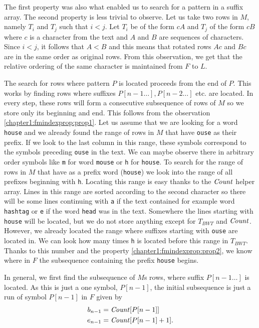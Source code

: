 The first property was also what enabled us to search for a pattern in a suffix array. The second
property is less trivial to observe. Let us take two rows in $M$, namely $T_i$ and $T_j$
such that $i<j$. Let $T_i$ be of the form $cA$ and $T_j$ of the form $cB$ where $c$ is a
character from the text and $A$ and $B$ are sequences of characters. Since $i<j$, it follows that
$A<B$ and this means that rotated rows $Ac$ and $Bc$ are in the same order as original rows.
From this observation, we get that the relative ordering of the same character is maintained
from $F$ to $L$.

The search for rows where pattern $P$ is located proceeds from the end of $P$. This works by
finding rows where suffixes $P[n-1\ldots], P[n-2\ldots]$ etc. are located. In every step, these
rows will form a consecutive subsequence of rows of $M$ so we store only its beginning and end.
This follows from the observation \ref{chapter1:fmindexprop:prop1}. Let us assume that we are
looking for a word {\tt house} and we already found the range of rows in $M$ that have {\tt ouse}
as their prefix. If we look to the last column in this range, these symbols correspond to the symbols
preceding {\tt ouse} in the text. We can maybe observe there in arbitrary order symbols like {\tt m}
for word {\tt mouse} or {\tt h} for {\tt house}. To search for the range of rows in $M$ that have as a prefix
word ({\tt house}) we look into the range of all prefixes beginning with {\tt h}. Locating this
range is easy thanks to the $\mathit{Count}$ helper array. Lines in this range are sorted according to the
second character so there will be some lines continuing with {\tt a} if the text contained for example
word {\tt hashtag} or {\tt e} if the word {\tt head} was in the text. Somewhere the lines starting with 
{\tt house} will be located, but we do not store anything except for $T_{BWT}$ and $\mathit{Count}$.
However, we already located the range where suffixes starting with {\tt ouse} are located in.
We can look how many times {\tt h} is located before this range in $T_{BWT}$. Thanks to this
number and the property \ref{chapter1:fmindexprop:prop2}, we know where in $F$ the subsequence
containing the prefix {\tt house} begins. 


In general, we first find the subsequence of $M$s rows, where suffix $P[n-1\ldots]$ is located.
As this is just a one symbol, $P[n-1]$, the initial subsequence is just a run of symbol $P[n-1]$
in $F$ given by
\begin{align*}
	b_{n-1}&=\mathit{Count}[P[n-1]] \\
	e_{n-1}&=\mathit{Count}[P[n-1]+1].\\
\end{align*}

